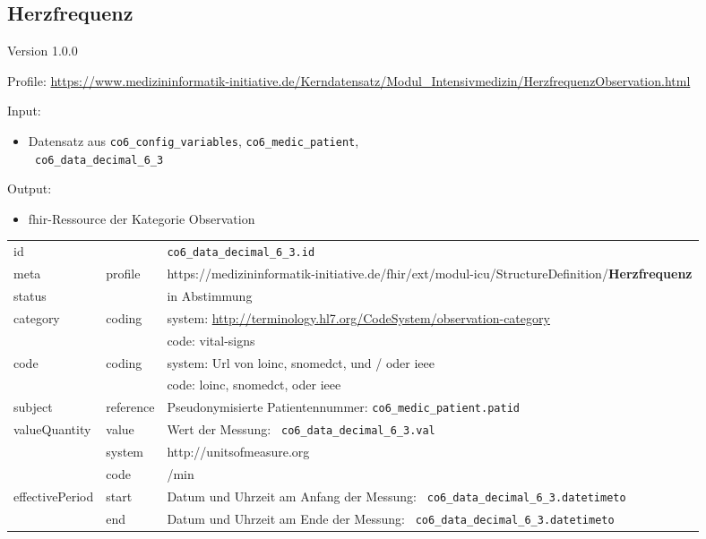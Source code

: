 \subsection{Herzfrequenz} 
\noindent Version 1.0.0

\noindent Profile: \url{https://www.medizininformatik-initiative.de/Kerndatensatz/Modul_Intensivmedizin/HerzfrequenzObservation.html}

\noindent Input:
\begin{itemize}
	\item Datensatz aus \texttt{co6\_config\_variables}, \texttt{co6\_medic\_patient}, \\ \texttt{
co6\_data\_decimal\_6\_3}
\end{itemize}
Output:
\begin{itemize}
        \item \ac{fhir}-Ressource der Kategorie \glqq Observation\grqq{}
\end{itemize}
\begin{longtable}{|l|l|p{7.5cm}|}
        \hline
        \rowcolor{lightgray} \multicolumn{3}{|l|}{Data Mapping (inhaltlich)} \\ \hline
        id &  & \texttt{co6\_data\_decimal\_6\_3.id} \\ \hline
	meta & profile & https://medizininformatik-initiative.de/fhir/ext/modul-icu/StructureDefinition/\textbf{Herzfrequenz} \\ \hline 
	status &  & in Abstimmung  \\ \hline 
	category & coding & system: \url{http://terminology.hl7.org/CodeSystem/observation-category} \\
\cline{3-3}
	& & code: vital-signs\\ \hline
	code & coding & system: Url von \ac{loinc}, \ac{snomedct}, und / oder \ac{ieee} \\ 
	\cline{3-3} 
	 &  & code: \ac{loinc}, \ac{snomedct}, oder \ac{ieee} \\ \hline
	subject & reference & Pseudonymisierte Patientennummer: \texttt{co6\_medic\_patient.patid} \\ \hline
	valueQuantity & value & Wert der Messung: \texttt{
co6\_data\_decimal\_6\_3.val} \\
        \cline{2-3}
         & system & http://unitsofmeasure.org \\
         \cline{2-3}
         & code & /min \\ \hline
    effectivePeriod & start & Datum und Uhrzeit am Anfang der Messung: \texttt{
co6\_data\_decimal\_6\_3.datetimeto} \\
    \cline{2-3}
     & end & Datum und Uhrzeit am Ende der Messung: \texttt{
co6\_data\_decimal\_6\_3.datetimeto} \\ \hline
\end{longtable}


